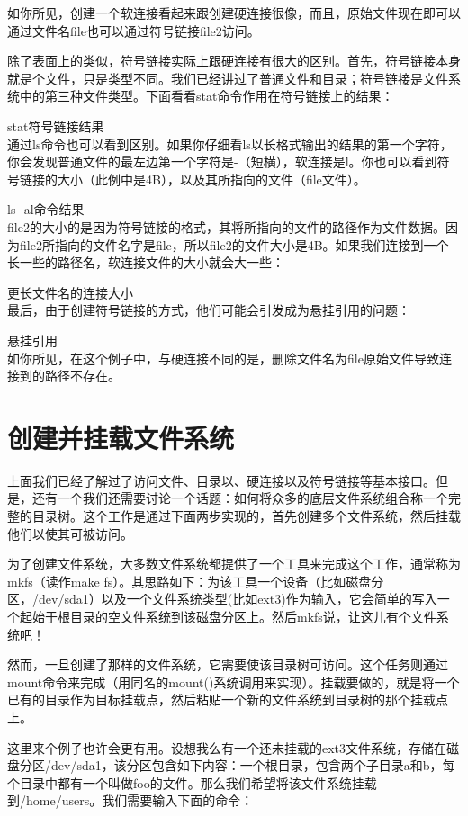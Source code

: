 如你所见，创建一个软连接看起来跟创建硬连接很像，而且，原始文件现在即可以通过文件名file也可以通过符号链接file2访问。

除了表面上的类似，符号链接实际上跟硬连接有很大的区别。首先，符号链接本身就是个文件，只是类型不同。我们已经讲过了普通文件和目录；符号链接是文件系统中的第三种文件类型。下面看看stat命令作用在符号链接上的结果：

stat符号链接结果\\

通过ls命令也可以看到区别。如果你仔细看ls以长格式输出的结果的第一个字符，你会发现普通文件的最左边第一个字符是-（短横），软连接是l。你也可以看到符号链接的大小（此例中是4B），以及其所指向的文件（file文件）。

ls -al命令结果\\

file2的大小的是因为符号链接的格式，其将所指向的文件的路径作为文件数据。因为file2所指向的文件名字是file，所以file2的文件大小是4B。如果我们连接到一个长一些的路径名，软连接文件的大小就会大一些：

更长文件名的连接大小\\

最后，由于创建符号链接的方式，他们可能会引发成为悬挂引用的问题：

悬挂引用\\

如你所见，在这个例子中，与硬连接不同的是，删除文件名为file原始文件导致连接到的路径不存在。

\section{创建并挂载文件系统}
上面我们已经了解过了访问文件、目录以、硬连接以及符号链接等基本接口。但是，还有一个我们还需要讨论一个话题：如何将众多的底层文件系统组合称一个完整的目录树。这个工作是通过下面两步实现的，首先创建多个文件系统，然后挂载他们以使其可被访问。

为了创建文件系统，大多数文件系统都提供了一个工具来完成这个工作，通常称为mkfs（读作make fs）。其思路如下：为该工具一个设备（比如磁盘分区，/dev/sda1）以及一个文件系统类型(比如ext3)作为输入，它会简单的写入一个起始于根目录的空文件系统到该磁盘分区上。然后mkfs说，让这儿有个文件系统吧！

然而，一旦创建了那样的文件系统，它需要使该目录树可访问。这个任务则通过mount命令来完成（用同名的mount()系统调用来实现）。挂载要做的，就是将一个已有的目录作为目标挂载点，然后粘贴一个新的文件系统到目录树的那个挂载点上。

这里来个例子也许会更有用。设想我么有一个还未挂载的ext3文件系统，存储在磁盘分区/dev/sda1，该分区包含如下内容：一个根目录，包含两个子目录a和b，每个目录中都有一个叫做foo的文件。那么我们希望将该文件系统挂载到/home/users。我们需要输入下面的命令：

